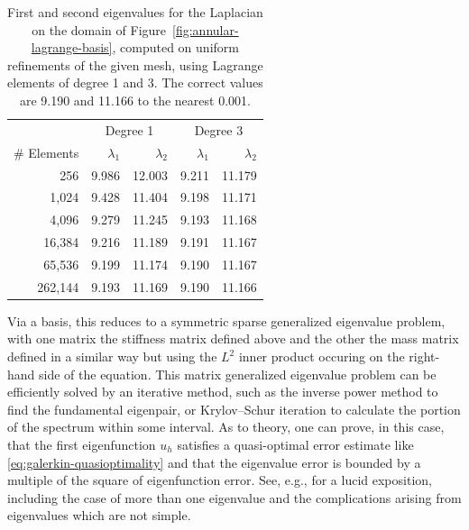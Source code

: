\begin{table}[H]\centering
\caption{{First and second eigenvalues for the Laplacian on the domain of Figure~\ref{fig:annular-lagrange-basis}, computed on uniform refinements of the given mesh, using Lagrange elements of degree 1 and 3. The correct values are 9.190 and 11.166 to the nearest 0.001.}}\label{tab:scalar-laplacian-eigenvalues}
\begin{tabular}{r|rr|rr}\hline
&\multicolumn{2}{c|}{{Degree 1}}&\multicolumn{2}{c}{{Degree 3}}\\
{\# Elements}&$\lambda_1$&$\lambda_2$&$\lambda_1$&$\lambda_2$\\\hline
256&9.986&12.003&9.211&11.179\\
1,024&9.428&11.404&9.198&11.171\\
4,096&9.279&11.245&9.193&11.168\\
16,384&9.216&11.189&9.191&11.167\\
65,536&9.199&11.174&9.190&11.167\\
262,144&9.193&11.169&9.190&11.166\\\hline
\end{tabular}
\end{table}

{Via a basis, this reduces to a symmetric sparse generalized eigenvalue problem, with one matrix the stiffness matrix defined above and the other the mass matrix defined in a similar way but using the $L^2$ inner product occuring on the right-hand side of the equation. This matrix generalized eigenvalue problem can be efficiently solved by an iterative method, such as the inverse power method to find the fundamental eigenpair, or Krylov–Schur iteration to calculate the portion of the spectrum within some interval. As to theory, one can prove, in this case, that the first eigenfunction $u_h$ satisfies a quasi-optimal error estimate like \eqref{eq:galerkin-quasioptimality} and that the eigenvalue error is bounded by a multiple of the square of eigenfunction error. See, e.g.,  for a lucid exposition, including the case of more than one eigenvalue and the complications arising from eigenvalues which are not simple.}

